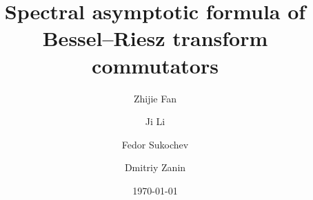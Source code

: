 \documentclass[12pt]{amsart}
\begin{document}
\baselineskip 16.6pt
\hfuzz=6pt

\newtheorem{cl}{Claim}
\newtheorem{theorem}{Theorem}[section]
\newtheorem{proposition}[theorem]{Proposition}
\newtheorem{coro}[theorem]{Corollary}
\newtheorem{lemma}[theorem]{Lemma}
\newtheorem{definition}[theorem]{Definition}
\newtheorem{assum}{Assumption}[section]
\newtheorem{example}[theorem]{Example}
\newtheorem{remark}[theorem]{Remark}
\newtheorem{fact}[theorem]{Fact}
\newtheorem{nota}[theorem]{Notation}
\renewcommand{\theequation}
{\thesection.\arabic{equation}}


\title[Spectral asymptotic formula]{Spectral asymptotic formula of Bessel--Riesz transform commutators}

\author{Zhijie Fan}
\address{Zhijie Fan, School of Mathematical Sciences, South China Normal University, Guangzhou 510631, China}

\author{Ji Li}
\address{Ji Li, School of Mathematical and Physical Sciences, Macquarie University, NSW 2109, Australia}

\author{Fedor Sukochev}
\address{Fedor Sukochev, University of New South Wales, Kensington, NSW 2052, Australia}

\author{Dmitriy Zanin}
\address{Dmitriy Zanin, University of New South Wales, Kensington, NSW 2052, Australia}








\date{\today}




%
%
%
%
\end{document}
